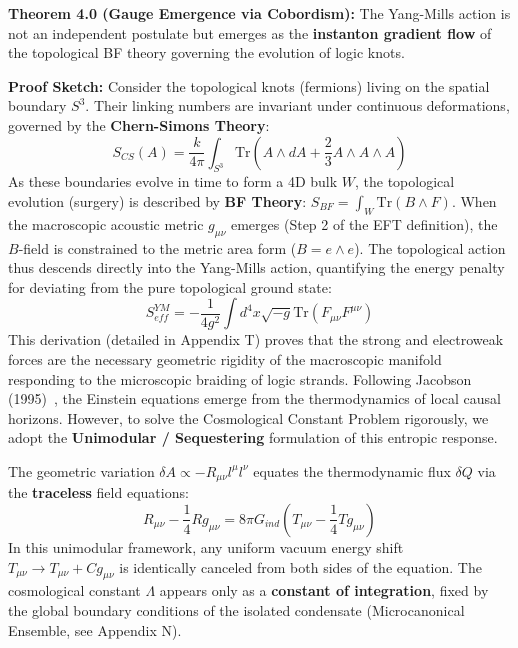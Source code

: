 \documentclass[a4paper,12pt]{article}
\begin{document}
\textbf{Theorem 4.0 (Gauge Emergence via Cobordism):} The Yang-Mills action is not an independent postulate but emerges as the \textbf{instanton gradient flow} of the topological BF theory governing the evolution of logic knots.

\textbf{Proof Sketch:}
Consider the topological knots (fermions) living on the spatial boundary $S^3$. Their linking numbers are invariant under continuous deformations, governed by the \textbf{Chern-Simons Theory}:
\begin{equation}
    S_{CS}(A) = \frac{k}{4\pi} \int_{S^3} \text{Tr}\left(A \wedge dA + \frac{2}{3}A \wedge A \wedge A \right)
\end{equation}
As these boundaries evolve in time to form a 4D bulk $W$, the topological evolution (surgery) is described by \textbf{BF Theory}: $S_{BF} = \int_W \text{Tr}(B \wedge F)$.
When the macroscopic acoustic metric $g_{\mu\nu}$ emerges (Step 2 of the EFT definition), the $B$-field is constrained to the metric area form ($B = e \wedge e$). The topological action thus descends directly into the Yang-Mills action, quantifying the energy penalty for deviating from the pure topological ground state:
\begin{equation}
    S_{eff}^{YM} = - \frac{1}{4g^2} \int d^4x \sqrt{-g} \text{Tr}(F_{\mu\nu} F^{\mu\nu})
\end{equation}
This derivation (detailed in Appendix T) proves that the strong and electroweak forces are the necessary geometric rigidity of the macroscopic manifold responding to the microscopic braiding of logic strands.
Following Jacobson (1995)~\cite{jacobson}, the Einstein equations emerge from the thermodynamics of local causal horizons. However, to solve the Cosmological Constant Problem rigorously, we adopt the \textbf{Unimodular / Sequestering} formulation of this entropic response.

The geometric variation $\delta A \propto -R_{\mu\nu} l^\mu l^\nu$ equates the thermodynamic flux $\delta Q$ via the \textbf{traceless} field equations:
\begin{equation}
    R_{\mu\nu} - \frac{1}{4}R g_{\mu\nu} = 8\pi G_{ind} \left( T_{\mu\nu} - \frac{1}{4}T g_{\mu\nu} \right)
\end{equation}
In this unimodular framework, any uniform vacuum energy shift $T_{\mu\nu} \to T_{\mu\nu} + C g_{\mu\nu}$ is identically canceled from both sides of the equation. The cosmological constant $\Lambda$ appears only as a \textbf{constant of integration}, fixed by the global boundary conditions of the isolated condensate (Microcanonical Ensemble, see Appendix N).
\end{document}

